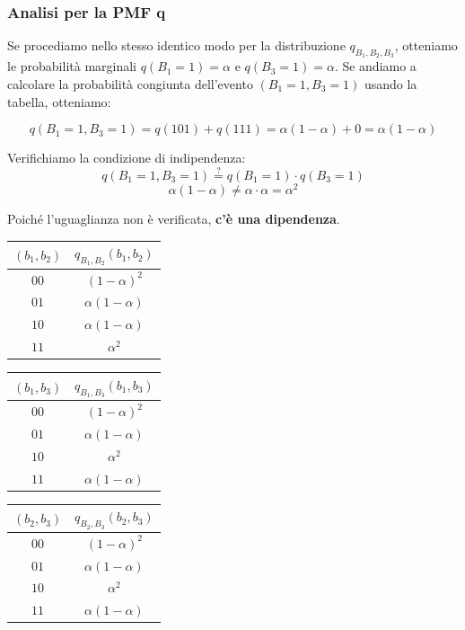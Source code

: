 \subsubsection{Analisi per la PMF q}
Se procediamo nello stesso identico modo per la distribuzione $q_{B_1,B_2,B_3}$, otteniamo le probabilità marginali $q(B_1=1) = \alpha$ e $q(B_3=1) = \alpha$.
Se andiamo a calcolare la probabilità congiunta dell'evento $(B_1=1, B_3=1)$ usando la tabella, otteniamo:

\[ q(B_1=1, B_3=1) = q(101) + q(111) = \alpha(1-\alpha) + 0 = \alpha(1-\alpha) \]

Verifichiamo la condizione di indipendenza:
\[ q(B_1=1, B_3=1) \stackrel{?}{=} q(B_1=1) \cdot q(B_3=1) \]
\[ \alpha(1-\alpha) \neq \alpha \cdot \alpha = \alpha^2 \]

Poiché l'uguaglianza non è verificata, \textbf{c'è una dipendenza}.

\begin{center}
    \begin{tabular}{|c|c|}
        \hline
        $(b_1, b_2)$ & $q_{B_1, B_2}(b_1, b_2)$ \\
        \hline
        $00$ & $(1-\alpha)^2$ \\
        $01$ & $\alpha(1-\alpha)$ \\
        $10$ & $\alpha(1-\alpha)$ \\
        $11$ & $\alpha^2$ \\
        \hline
    \end{tabular}
    \quad
    \begin{tabular}{|c|c|}
        \hline
        $(b_1, b_3)$ & $q_{B_1, B_3}(b_1, b_3)$ \\
        \hline
        $00$ & $(1-\alpha)^2$ \\
        $01$ & $\alpha(1-\alpha)$ \\
        $10$ & $\alpha^2$ \\
        $11$ & $\alpha(1-\alpha)$ \\
        \hline
    \end{tabular}
    \quad
    \begin{tabular}{|c|c|}
        \hline
        $(b_2, b_3)$ & $q_{B_2, B_3}(b_2, b_3)$ \\
        \hline
        $00$ & $(1-\alpha)^2$ \\
        $01$ & $\alpha(1-\alpha)$ \\
        $10$ & $\alpha^2$ \\
        $11$ & $\alpha(1-\alpha)$ \\
        \hline
    \end{tabular}
\end{center}

